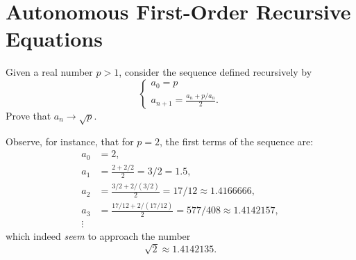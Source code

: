 \section{Autonomous First-Order Recursive Equations}

\begin{example}\label{ex_Erone}
%
%
%
%
  Given a real number $p>1$, consider the sequence defined recursively by
\[
\begin{cases}
  a_0 = p\\
  a_{n+1} = \frac{a_n + p/a_n}{2}.
\end{cases}
\]
Prove that $a_n \to \sqrt p$.
\end{example}
Observe, for instance, that for $p=2$, the first terms of the sequence are:
\begin{align*}
a_0 &= 2, \\
a_1 &= \frac{2+2/2}{2} = 3/2 = 1.5, \\
a_2 &= \frac{3/2 + 2/(3/2)}{2} = 17/12 \approx 1.4166666, \\
a_3 &= \frac{17/12 + 2/(17/12)}{2} = 577 / 408 \approx 1.4142157,\\
\vdots
\end{align*}
which indeed \emph{seem} to approach the number
\[
\sqrt 2\approx 1.4142135.
\]

